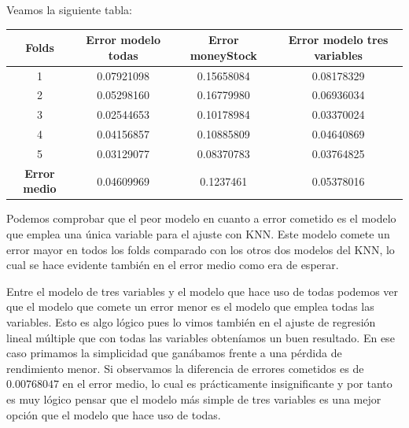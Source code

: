 \documentclass[12pt,a4paper]{article}
\begin{document}
Veamos la siguiente tabla:

\begin{table}[H]
	\centering
	\begin{tabular}{|c|c|c|c|}
		\hline
		\textbf{Folds}       & \textbf{Error modelo todas} & \textbf{Error moneyStock} & \textbf{Error modelo tres variables} \\ \hline
		1                    & 0.07921098                  & 0.15658084                & 0.08178329                           \\ \hline
		2                    & 0.05298160                  & 0.16779980                & 0.06936034                           \\ \hline
		3                    & 0.02544653                  & 0.10178984                & 0.03370024                           \\ \hline
		4                    & 0.04156857                  & 0.10885809                & 0.04640869                           \\ \hline
		5                    & 0.03129077                  & 0.08370783                & 0.03764825                           \\ \hline
		\textbf{Error medio} & 0.04609969                  & 0.1237461                 & 0.05378016                           \\ \hline
	\end{tabular}
\end{table}

Podemos comprobar que el peor modelo en cuanto a error cometido es el modelo que emplea una única variable para el ajuste con KNN. Este modelo comete un error mayor en todos los folds comparado con los otros dos modelos del KNN, lo cual se hace evidente también en el error medio como era de esperar.

Entre el modelo de tres variables y el modelo que hace uso de todas podemos ver que el modelo que comete un error menor es el modelo que emplea todas las variables. Esto es algo lógico pues lo vimos también en el ajuste de regresión lineal múltiple que con todas las variables obteníamos un buen resultado. En ese caso primamos la simplicidad que ganábamos frente a una pérdida de rendimiento menor. Si observamos la diferencia de errores cometidos es de $0.00768047$ en el error medio, lo cual es prácticamente insignificante y por tanto es muy lógico pensar que el modelo más simple de tres variables es una mejor opción que el modelo que hace uso de todas.
\end{document}
